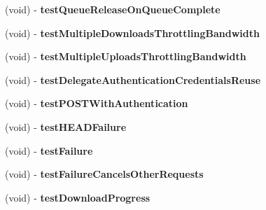\begin{DoxyCompactItemize}
\item 
\hypertarget{interface_a_s_i_network_queue_tests_a8367da7729b914e691602cbfbb0cd4d6}{
(void) -\/ {\bfseries test\-Queue\-Release\-On\-Queue\-Complete}}
\label{interface_a_s_i_network_queue_tests_a8367da7729b914e691602cbfbb0cd4d6}

\item 
\hypertarget{interface_a_s_i_network_queue_tests_afecabb41732addf7e0b63960536af284}{
(void) -\/ {\bfseries test\-Multiple\-Downloads\-Throttling\-Bandwidth}}
\label{interface_a_s_i_network_queue_tests_afecabb41732addf7e0b63960536af284}

\item 
\hypertarget{interface_a_s_i_network_queue_tests_a3c936cbdc4d5d95c086acccc6b61a277}{
(void) -\/ {\bfseries test\-Multiple\-Uploads\-Throttling\-Bandwidth}}
\label{interface_a_s_i_network_queue_tests_a3c936cbdc4d5d95c086acccc6b61a277}

\item 
\hypertarget{interface_a_s_i_network_queue_tests_ad451f41961e411ca4e0a493564f3782e}{
(void) -\/ {\bfseries test\-Delegate\-Authentication\-Credentials\-Reuse}}
\label{interface_a_s_i_network_queue_tests_ad451f41961e411ca4e0a493564f3782e}

\item 
\hypertarget{interface_a_s_i_network_queue_tests_aa73ecf9606cf1826f4137aef4ff343be}{
(void) -\/ {\bfseries test\-P\-O\-S\-T\-With\-Authentication}}
\label{interface_a_s_i_network_queue_tests_aa73ecf9606cf1826f4137aef4ff343be}

\item 
\hypertarget{interface_a_s_i_network_queue_tests_aa50e545358ffc84eea2a4f61e6d782eb}{
(void) -\/ {\bfseries test\-H\-E\-A\-D\-Failure}}
\label{interface_a_s_i_network_queue_tests_aa50e545358ffc84eea2a4f61e6d782eb}

\item 
\hypertarget{interface_a_s_i_network_queue_tests_a676be0402a758bbd669e8b11f7bb368d}{
(void) -\/ {\bfseries test\-Failure}}
\label{interface_a_s_i_network_queue_tests_a676be0402a758bbd669e8b11f7bb368d}

\item 
\hypertarget{interface_a_s_i_network_queue_tests_a1d3ea45df0ebc0597e234c1a2fa3c35b}{
(void) -\/ {\bfseries test\-Failure\-Cancels\-Other\-Requests}}
\label{interface_a_s_i_network_queue_tests_a1d3ea45df0ebc0597e234c1a2fa3c35b}

\item 
\hypertarget{interface_a_s_i_network_queue_tests_a59b48bbf964a2a4ac6626270d519748a}{
(void) -\/ {\bfseries test\-Download\-Progress}}
\label{interface_a_s_i_network_queue_tests_a59b48bbf964a2a4ac6626270d519748a}


\end{DoxyCompactItemize}

